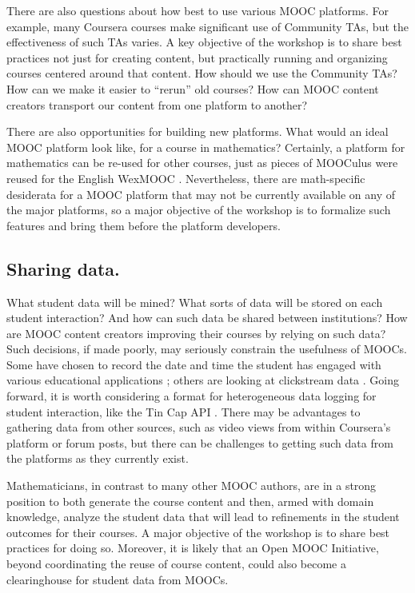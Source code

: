 \documentclass[12pt]{amsart}
\begin{document}
There are also questions about how best to use various MOOC platforms.
For example, many Coursera courses make significant use of Community
TAs, but the effectiveness of such TAs varies.  A key objective of the
workshop is to share best practices not just for creating content, but
practically running and organizing courses centered around that
content.  How should we use the Community TAs?  How can we make it
easier to ``rerun'' old courses?  How can MOOC content creators
transport our content from one platform to another?

There are also opportunities for building new platforms.  What would
an ideal MOOC platform look like, for a course in mathematics?
Certainly, a platform for mathematics can be re-used for other
courses, just as pieces of MOOCulus were reused for the English
WexMOOC \cite{gates-foundation-grant}.  Nevertheless, there are
math-specific desiderata for a MOOC platform that may not be currently
available on any of the major platforms, so a major objective of the
workshop is to formalize such features and bring them before the
platform developers.

\subsection{Sharing data.} What student data will be mined?  What
sorts of data will be stored on each student interaction?  And how can
such data be shared between institutions?  How are MOOC content
creators improving their courses by relying on such data?  Such
decisions, if made poorly, may seriously constrain the usefulness of
MOOCs.  Some have chosen to record the date and time the student has
engaged with various educational
applications \parencite{RomeroZaldivar20121058}; others are looking at
clickstream data \parencite{boyer2013student}.  Going forward, it is
worth considering a format for heterogeneous data logging for student
interaction, like the Tin Cap API \parencite{tin-can-api}.  There may
be advantages to gathering data from other sources, such as video
views from within Coursera's platform or forum posts, but there can be
challenges to getting such data from the platforms as they currently
exist.

Mathematicians, in contrast to many other MOOC authors, are in a
strong position to both generate the course content and then, armed
with domain knowledge, analyze the student data that will lead to
refinements in the student outcomes for their courses.  A major
objective of the workshop is to share best practices for doing so.
Moreover, it is likely that an Open MOOC Initiative, beyond
coordinating the reuse of course content, could also become a
clearinghouse for student data from MOOCs.
\end{document}
